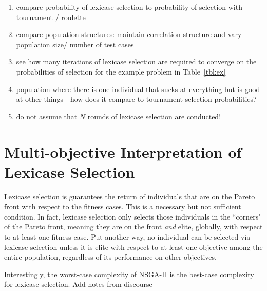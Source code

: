 \documentclass[preprint]{article}
\begin{document}
\begin{enumerate}
\item compare probability of lexicase selection to probability of selection with tournament / roulette 
\item compare population structures: maintain correlation structure and vary population size/ number of test cases
\item see how many iterations of lexicase selection are required to converge on the probabilities of selection for the example problem in Table~\ref{tbl:ex}
\item population where there is one individual that sucks at everything but is good at other things - how does it compare to tournament selection probabilities?
\item do not assume that $N$ rounds of lexicase selection are conducted!
\end{enumerate}

\section{Multi-objective Interpretation of Lexicase Selection}
Lexicase selection is guarantees the return of individuals that are on the Pareto front with respect to the fitness cases. This is a necessary but not sufficient condition. In fact, lexicase selection only selects those individuals in the ``corners" of the Pareto front, meaning they are on the front {\it and} elite, globally, with respect to at least one fitness case. Put another way, no individual can be selected via lexicase selection unless it is elite with respect to at least one objective among the entire population, regardless of its performance on other objectives. 

Interestingly, the worst-case complexity of NSGA-II is the best-case complexity for lexicase selection. Add notes from discourse
\end{document}
